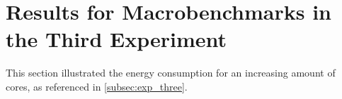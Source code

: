 \section{Results for Macrobenchmarks in the Third Experiment}\label{app:app_exp_three}

This section illustrated the energy consumption for an increasing amount of cores, as referenced in \cref{subsec:exp_three}.



% 

% 
% 
% 

% 
% 
% 

% 
% 
% 

% 
% 
% 